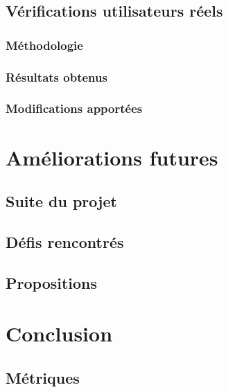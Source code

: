 \documentclass{EPL-master-thesis-covers-FR}
\begin{document}
			

		\section{Vérifications utilisateurs réels}


			\subsection*{Méthodologie}

				

			\subsection*{Résultats obtenus}

				

			\subsection*{Modifications apportées}

		

	\chapter{Améliorations futures}


		\section{Suite du projet}
			\label{ref:suite_projet}

		

		\section{Défis rencontrés}

			

		\section{Propositions}

			
	\chapter{Conclusion}

		

		\section{Métriques}
		

	{}
	
		

	

	\setlength{\parskip}{0em}
	\backcoverpage
\end{document}
